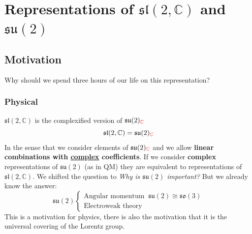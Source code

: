 \documentclass[../main.tex]{subfiles}
\begin{document}
\setchapterpreamble[u]{\margintoc}
\chapter[Representations of $\mathfrak{sl}(2,\mathbb{C})$ and $\mathfrak{su}(2)$]{Representations of $\mathfrak{sl}(2,\mathbb{C})$ and $\mathfrak{su}(2)$\footnotemark[0]}
\section{Motivation}
Why should we spend three hours of our life on this representation?
\subsection{Physical}
$\mathfrak{sl}(2,\mathbb{C})$ is the complexified version of $\mathfrak{su}(2)_{\color{red}{\mathbb{C}}}$
\[
\mathfrak{sl}(2,\mathbb{C})=\mathfrak{su}(2)_{\color{red}{\mathbb{C}}}
\]
In the sense that we consider elements of $\mathfrak{su}(2)_{\color{red}{\mathbb{C}}}$ and we allow \textbf{linear combinations with \underline{complex} coefficients}. If we consider \textbf{complex} representations of $\mathfrak{su}(2)$ (as in QM) they are equivalent to representations of {\color{red}$\mathfrak{sl}(2,\mathbb{C})$}. We shifted the question to \textit{Why is $\mathfrak{su}(2)$ important?} But we already know the answer:
\[
\mathfrak{su}(2)
\begin{cases}
\textrm{Angular momentum } \ \mathfrak{su}(2)\cong \mathfrak{so}(3)\\
\textrm{Electroweak theory}
\end{cases}
\]
This is a motivation for physics, there is also the motivation that it is the universal covering of the Lorentz group.
\end{document}
